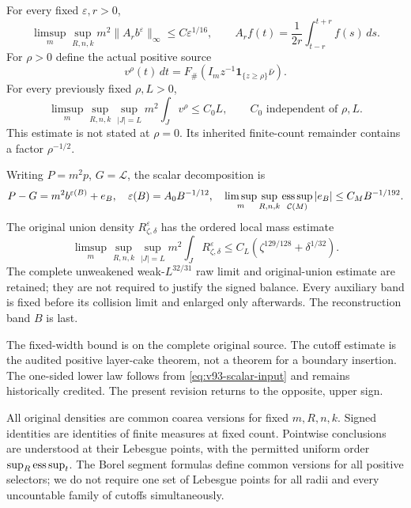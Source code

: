 \begin{inputstatement}
\label{input:v93-analytic}
For every fixed $\varepsilon,r>0$,
\begin{equation}\label{eq:v93-bad-input}
 \limsup_m\sup_{R,n,k}m^2\|A_rb^\varepsilon\|_\infty
        \le C\varepsilon^{1/16},\qquad
 A_rf(t)=\frac1{2r}\int_{t-r}^{t+r}f(s)\,ds.
\end{equation}
For $\rho>0$ define the actual positive source
\[
 v^\rho(t)\,dt
       =F_\#(I_m z^{-1}\mathbf1_{\{z\ge\rho\}}\bar\nu).
\]
For every previously fixed $\rho,L>0$,
\begin{equation}\label{eq:v93-cutoff-input}
 \limsup_m\sup_{R,n,k}\sup_{|J|=L}m^2\int_J v^\rho\le C_0L,
          \qquad C_0\text{ independent of }\rho,L.
\end{equation}
This estimate is not stated at $\rho=0$. Its inherited finite-count
remainder contains a factor $\rho^{-1/2}$.

Writing $P=m^2p$, $G=\mathcal L$, the scalar decomposition is
\begin{equation}\label{eq:v93-scalar-input}
 P-G=m^2b^{\varepsilon(B)}+e_B,\quad
 \varepsilon(B)=A_0B^{-1/12},\quad
 \limsup_m\sup_{R,n,k}\esssup_{\mathcal C(M)}|e_B|
                                  \le C_MB^{-1/192}.
\end{equation}
The original union density $R_{\zeta,\delta}^\varepsilon$ has the
ordered local mass estimate
\[
 \limsup_m\sup_{R,n,k}\sup_{|J|=L}m^2\int_J
 R_{\zeta,\delta}^\varepsilon
       \le C_L(\zeta^{129/128}+\delta^{1/32}).
\]
The complete unweakened weak-$L^{32/31}$ raw limit and original-union
estimate are retained; they are not required to justify the signed
balance. Every auxiliary band is fixed before its collision limit
and enlarged only afterwards. The reconstruction band $B$ is last.
\end{inputstatement}
The fixed-width bound is on the complete original source. The cutoff
estimate is the audited positive layer-cake theorem, not a theorem
for a boundary insertion. The one-sided lower law follows from
\eqref{eq:v93-scalar-input} and remains historically credited. The
present revision returns to the opposite, upper sign.

All original densities are common coarea versions for fixed
$m,R,n,k$. Signed identities are identities of finite measures at
fixed count. Pointwise conclusions are understood at their Lebesgue
points, with the permitted uniform order $\sup_R\operatorname*{ess\,sup}_t$.
The Borel segment formulas define common versions for all positive
selectors; we do not require one set of Lebesgue points for all
radii and every uncountable family of cutoffs simultaneously.
